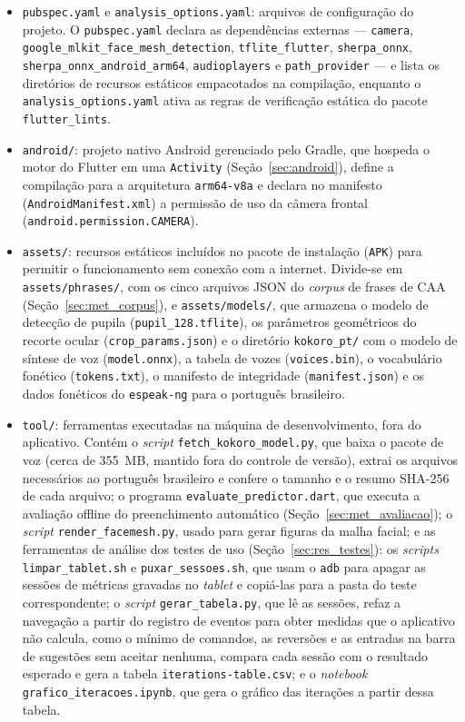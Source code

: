 \begin{itemize}
    \item \texttt{pubspec.yaml} e \texttt{analysis\_options.yaml}: arquivos de configuração do projeto. O \texttt{pubspec.yaml} declara as dependências externas --- \texttt{camera}, \texttt{google\_\allowbreak mlkit\_\allowbreak face\_\allowbreak mesh\_\allowbreak detection}, \texttt{tflite\_\allowbreak flutter}, \texttt{sherpa\_\allowbreak onnx}, \texttt{sherpa\_\allowbreak onnx\_\allowbreak android\_\allowbreak arm64}, \texttt{audioplayers} e \texttt{path\_\allowbreak provider} --- e lista os diretórios de recursos estáticos empacotados na compilação, enquanto o \texttt{analysis\_\allowbreak options.yaml} ativa as regras de verificação estática do pacote \texttt{flutter\_lints}.
    \item \texttt{android/}: projeto nativo Android gerenciado pelo Gradle, que hospeda o motor do Flutter em uma \texttt{Activity} (Seção~\ref{sec:android}), define a compilação para a arquitetura \texttt{arm64-v8a} e declara no manifesto (\texttt{AndroidManifest.xml}) a permissão de uso da câmera frontal (\texttt{android.\allowbreak permission.\allowbreak CAMERA}).
    \item \texttt{assets/}: recursos estáticos incluídos no pacote de instalação (\texttt{APK}) para permitir o funcionamento sem conexão com a internet. Divide-se em \texttt{assets/phrases/}, com os cinco arquivos JSON do \textit{corpus} de frases de \gls{CAA} (Seção~\ref{sec:met_corpus}), e \texttt{assets/models/}, que armazena o modelo de detecção de pupila (\texttt{pupil\_128.tflite}), os parâmetros geométricos do recorte ocular (\texttt{crop\_params.json}) e o diretório \texttt{kokoro\_pt/} com o modelo de síntese de voz (\texttt{model.onnx}), a tabela de vozes (\texttt{voices.bin}), o vocabulário fonético (\texttt{tokens.txt}), o manifesto de integridade (\texttt{manifest.json}) e os dados fonéticos do \texttt{espeak-ng} para o português brasileiro.
    \item \texttt{tool/}: ferramentas executadas na máquina de desenvolvimento, fora do aplicativo. Contém o \textit{script} \texttt{fetch\_kokoro\_model.py}, que baixa o pacote de voz (cerca de 355~MB, mantido fora do controle de versão), extrai os arquivos necessários ao português brasileiro e confere o tamanho e o resumo SHA-256 de cada arquivo; o programa \texttt{evaluate\_predictor.dart}, que executa a avaliação offline do preenchimento automático (Seção~\ref{sec:met_avaliacao}); o \textit{script} \texttt{render\_facemesh.py}, usado para gerar figuras da malha facial; e as ferramentas de análise dos testes de uso (Seção~\ref{sec:res_testes}): os \textit{scripts} \texttt{limpar\_tablet.sh} e \texttt{puxar\_sessoes.sh}, que usam o \texttt{adb} para apagar as sessões de métricas gravadas no \textit{tablet} e copiá-las para a pasta do teste correspondente; o \textit{script} \texttt{gerar\_tabela.py}, que lê as sessões, refaz a navegação a partir do registro de eventos para obter medidas que o aplicativo não calcula, como o mínimo de comandos, as reversões e as entradas na barra de sugestões sem aceitar nenhuma, compara cada sessão com o resultado esperado e gera a tabela \texttt{iterations-table.csv}; e o \textit{notebook} \texttt{grafico\_iteracoes.ipynb}, que gera o gráfico das iterações a partir dessa tabela.

\end{itemize}
